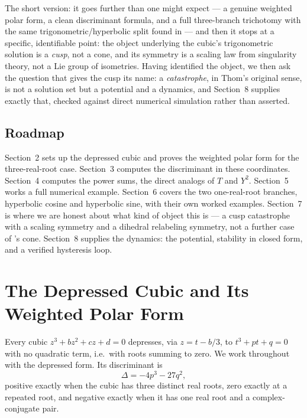 \documentclass[11pt]{amsart}
\theoremstyle{remark}
\begin{document}
The short version: it goes further than one might expect --- a genuine weighted polar form, a clean discriminant formula, and a full three-branch trichotomy with the same trigonometric/hyperbolic split found in \cite{Ebert2026EigenCoord} --- and then it stops at a specific, identifiable point: the object underlying the cubic's trigonometric solution is a \emph{cusp}, not a cone, and its symmetry is a scaling law from singularity theory, not a Lie group of isometries. Having identified the object, we then ask the question that gives the cusp its name: a \emph{catastrophe}, in Thom's original sense, is not a solution set but a potential and a dynamics, and Section~8 supplies exactly that, checked against direct numerical simulation rather than asserted.

\subsection*{Roadmap} Section~2 sets up the depressed cubic and proves the weighted polar form for the three-real-root case. Section~3 computes the discriminant in these coordinates. Section~4 computes the power sums, the direct analogs of $T$ and $Y^2$. Section~5 works a full numerical example. Section~6 covers the two one-real-root branches, hyperbolic cosine and hyperbolic sine, with their own worked examples. Section~7 is where we are honest about what kind of object this is --- a cusp catastrophe with a scaling symmetry and a dihedral relabeling symmetry, not a further case of \cite{Ebert2026EigenCoord}'s cone. Section~8 supplies the dynamics: the potential, stability in closed form, and a verified hysteresis loop.

\section{The Depressed Cubic and Its Weighted Polar Form}

Every cubic $z^3+bz^2+cz+d=0$ depresses, via $z=t-b/3$, to $t^3+pt+q=0$ with no quadratic term, i.e.\ with roots summing to zero. We work throughout with the depressed form. Its discriminant is
\begin{equation}
\Delta=-4p^3-27q^2, \tag{2.1}
\end{equation}
positive exactly when the cubic has three distinct real roots, zero exactly at a repeated root, and negative exactly when it has one real root and a complex-conjugate pair.
\end{document}
